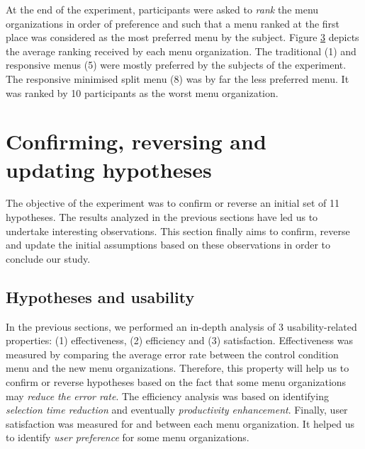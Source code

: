 \begin{figure}[!ht]
    
    \label{fig:satisfaction_ratio}
\end{figure}

\begin{figure}[!ht]
    
    \label{fig:satisfaction_gender}
\end{figure}

At the end of the experiment, participants were asked to \textit{rank} the menu 
organizations in order of preference and such that a menu ranked at the first 
place was considered as the most preferred menu by the subject. Figure 
\ref{fig:rankings} depicts the average ranking received by each menu 
organization. The traditional (1) and responsive menus (5) were mostly 
preferred by the subjects of the experiment. The responsive minimised split 
menu (8) was by far the less preferred menu. It was ranked by 10 participants as 
the worst menu organization.

\begin{figure}[!ht]
    
    \label{fig:rankings}
\end{figure}

\section{Confirming, reversing and updating hypotheses}
The objective of the experiment was to confirm or reverse an initial set of 
11 hypotheses. The results analyzed in the previous sections have led us to 
undertake interesting observations. This section finally aims to confirm, 
reverse and update the initial assumptions based on these observations in order 
to conclude our study.

\subsection{Hypotheses and usability}
In the previous sections, we performed an in-depth analysis of 3 
usability-related properties: (1) effectiveness, (2) efficiency and (3) 
satisfaction. Effectiveness was measured by comparing the average error rate 
between the control condition menu and the new menu organizations. Therefore, 
this property will help us to confirm or reverse hypotheses based on the fact 
that some menu organizations may \textit{reduce the error rate}. The efficiency 
analysis was based on identifying \textit{selection time reduction} and 
eventually \textit{productivity enhancement}. Finally, user satisfaction was 
measured for and between each menu organization. It helped us to identify 
\textit{user preference} for some menu organizations.\newline

